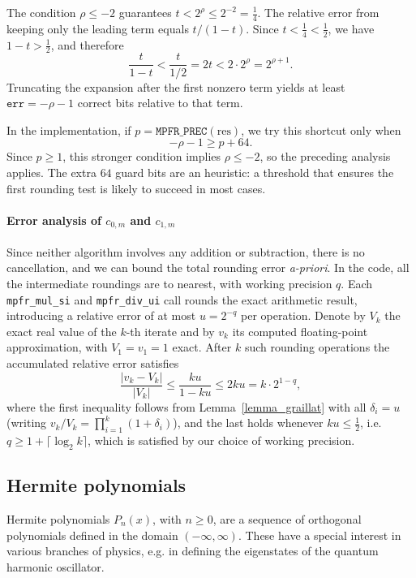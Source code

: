 \documentclass[12pt]{amsart}
\begin{document}
The condition $\rho \le -2$ guarantees
$t < 2^\rho \le 2^{-2} = \tfrac{1}{4}$.
The relative error from keeping only the leading term equals $t/(1-t)$.
Since $t < \tfrac{1}{4} < \tfrac{1}{2}$, we have $1 - t > \tfrac{1}{2}$,
and therefore
\[
  \frac{t}{1-t} < \frac{t}{1/2} = 2t < 2 \cdot 2^\rho = 2^{\rho+1}.
\]
Truncating the expansion after the first nonzero term yields at least
$\mathtt{err} = -\rho - 1$ correct bits relative to that term.

In the implementation, if $p = \texttt{MPFR\_PREC}(\mathrm{res})$, we try this
shortcut only when
\[
  -\rho - 1 \ge p + 64.
\]
Since $p \ge 1$, this stronger condition implies $\rho \le -2$, so the
preceding analysis applies. The extra $64$ guard bits are an heuristic:
a threshold that ensures the first rounding test is likely to succeed
in most cases.

\paragraph{\textbf{Error analysis of $c_{0,m}$ and $c_{1,m}$}}
\label{par:legendre-error-analysis}

Since neither algorithm involves any addition or subtraction, there is no
cancellation, and we can bound the total rounding error \textit{a-priori}.
In the code, all the intermediate roundings are to nearest, with working
precision $q$. Each \texttt{mpfr\_mul\_si} and \texttt{mpfr\_div\_ui} call
rounds the exact arithmetic result, introducing a relative error of at most
$u = 2^{-q}$ per operation. Denote by $V_k$ the exact real value of the
$k$-th iterate and by $v_k$ its computed floating-point approximation, with
$V_1 = v_1 = 1$ exact. After $k$ such rounding operations the accumulated
relative error satisfies
\[
  \frac{|v_k - V_k|}{|V_k|}
  \le \frac{ku}{1-ku}
  \le 2ku = k \cdot 2^{1-q},
\]
where the first inequality follows from Lemma~\ref{lemma_graillat} with all
$\delta_i = u$ (writing $v_k/V_k = \prod_{i=1}^k(1+\delta_i)$), and the last
holds whenever $ku \le \tfrac{1}{2}$, i.e. $q \ge 1 + \lceil\log_2 k\rceil$,
which is satisfied by our choice of working precision.

\subsection{Hermite polynomials}
\label{subsec:hermite-polynomials}

Hermite polynomials $P_n(x)$, with $n \geq 0$, are a sequence of orthogonal
polynomials defined in the domain $(-\infty,\infty)$. These have a special
interest in various branches of physics, e.g. in defining the eigenstates
of the quantum harmonic oscillator.
\end{document}
